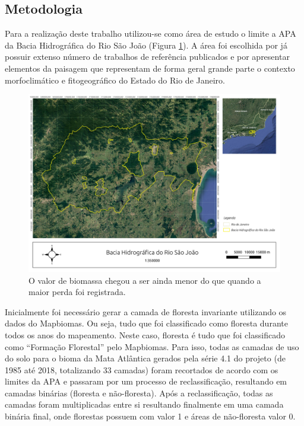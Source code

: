 \subsection{Metodologia}

\hspace{13pt} Para a realização deste trabalho utilizou-se como área de estudo o limite a APA da Bacia Hidrográfica do Rio São João (Figura \ref{fig:bhrsj}). A área foi escolhida por já possuir extenso número de trabalhos de referência publicados e por apresentar elementos da paisagem que representam de forma geral grande parte o contexto morfoclimático e fitogeográfico do Estado do Rio de Janeiro.

\begin{figure}[h!]
    \centering
    \includegraphics[scale=.5]{images/bhrsj_v2.pdf}
    \caption{O valor de biomassa chegou a ser ainda menor do que quando a maior perda foi registrada.}
    \label{fig:bhrsj}
\end{figure}

Inicialmente foi necessário gerar a camada de floresta invariante utilizando os dados do Mapbiomas. Ou seja, tudo que foi classificado como floresta durante todos os anos do mapeamento. Neste caso, floresta é tudo que foi classificado como “Formação Florestal” pelo Mapbiomas. Para isso, todas as camadas de uso do solo para o bioma da Mata Atlântica gerados pela série 4.1 do projeto (de 1985 até 2018, totalizando 33 camadas) foram recortados de acordo com os limites da APA e passaram por um processo de reclassificação, resultando em camadas binárias (floresta e não-floresta). Após a reclassificação, todas as camadas foram multiplicadas entre si resultando finalmente em uma camada binária final, onde florestas possuem com valor 1 e áreas de não-floresta valor 0.

